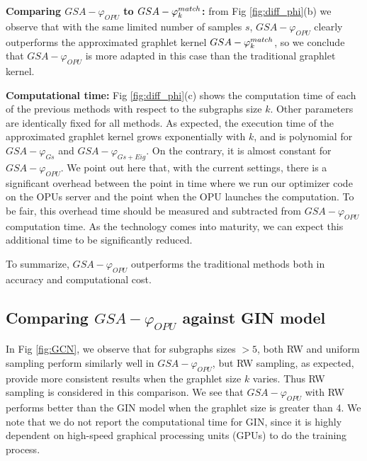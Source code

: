 \documentclass{article}
\begin{document}
\noindent\textbf{Comparing $GSA-\varphi_{OPU}$ to $GSA-\varphi^{match}_k$:} from Fig \ref{fig:diff_phi}(b) we observe that  with the same limited number of samples $s$, $GSA-\varphi_{OPU}$ clearly outperforms the approximated graphlet kernel $GSA-\varphi^{match}_k$, so we conclude that $GSA-\varphi_{OPU}$ is more adapted in this case than the traditional graphlet kernel.

\noindent\textbf{Computational time:} Fig \ref{fig:diff_phi}(c) shows the computation time of each of the previous methods with respect to the subgraphs size $k$. Other parameters are identically fixed for all methods. As expected, the execution time of the approximated graphlet kernel grows exponentially with  $k$, and is polynomial for $GSA-\varphi_{Gs}$ and $GSA-\varphi_{Gs+Eig}$. On the contrary, it is almost constant for $GSA-\varphi_{OPU}$. We point out here that, with the current settings, there is a significant overhead between the point in time where we run our optimizer code on the OPUs server and the point when the OPU  launches the computation. To be fair, this overhead time should be measured and subtracted from $GSA-\varphi_{OPU}$ computation time. As the technology comes into maturity, we can expect this additional time to be significantly reduced. 

To summarize, $GSA-\varphi_{OPU}$ outperforms the traditional methods both in accuracy and computational cost.


\subsection{Comparing $GSA-\varphi_{OPU}$ against GIN model}\label{sec:vs_GIN}

In Fig \ref{fig:GCN}, we observe that for subgraphs sizes $>5$, both RW and uniform sampling perform similarly well in $GSA-\varphi_{OPU}$, but RW sampling, as expected, provide more consistent results when the graphlet size $k$ varies. Thus RW sampling is considered in this comparison.
We see that $GSA-\varphi_{OPU}$ with RW  performs better than the GIN model when the graphlet size is greater than 4. We note that we do not report the computational time for GIN, since it is highly dependent on high-speed graphical processing units (GPUs) to do the training process.
\end{document}
